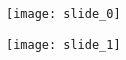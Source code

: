 \documentclass[11pt]{article}
\begin{document}
    \begin{center}
    \texttt{[image: slide\_0]}
    \end{center}

        \begin{center}
    \texttt{[image: slide\_1]}
    \end{center}
\end{document}
